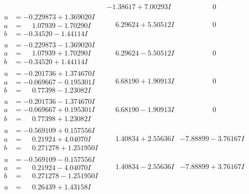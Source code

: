\documentclass[1p]{elsarticle_modified}
\theoremstyle{definition}
\begin{document}
$$\begin{array}{c|c|c}
 & -1.38617 + 7.00293 I & \phantom{-0.000000 } 0 \\ \hline\begin{aligned}
u &= -0.229873 + 1.369020 I \\
a &= \phantom{-}1.07939 - 1.70290 I \\
b &= -0.34520 - 1.44114 I\end{aligned}
 & \phantom{-}6.29624 + 5.50512 I & \phantom{-0.000000 } 0 \\ \hline\begin{aligned}
u &= -0.229873 - 1.369020 I \\
a &= \phantom{-}1.07939 + 1.70290 I \\
b &= -0.34520 + 1.44114 I\end{aligned}
 & \phantom{-}6.29624 - 5.50512 I & \phantom{-0.000000 } 0 \\ \hline\begin{aligned}
u &= -0.201736 + 1.374670 I \\
a &= -0.069667 - 0.195301 I \\
b &= \phantom{-}0.77398 - 1.23082 I\end{aligned}
 & \phantom{-}6.68190 + 1.90913 I & \phantom{-0.000000 } 0 \\ \hline\begin{aligned}
u &= -0.201736 - 1.374670 I \\
a &= -0.069667 + 0.195301 I \\
b &= \phantom{-}0.77398 + 1.23082 I\end{aligned}
 & \phantom{-}6.68190 - 1.90913 I & \phantom{-0.000000 } 0 \\ \hline\begin{aligned}
u &= -0.569109 + 0.157556 I \\
a &= \phantom{-}0.21924 + 4.04070 I \\
b &= \phantom{-}0.271278 + 1.251950 I\end{aligned}
 & \phantom{-}1.40834 + 2.55636 I & -7.88899 - 3.76167 I \\ \hline\begin{aligned}
u &= -0.569109 - 0.157556 I \\
a &= \phantom{-}0.21924 - 4.04070 I \\
b &= \phantom{-}0.271278 - 1.251950 I\end{aligned}
 & \phantom{-}1.40834 - 2.55636 I & -7.88899 + 3.76167 I \\ \hline\begin{aligned}
u &= \phantom{-}0.26439 + 1.43158 I \\

\end{aligned}
\end{array}$$
\end{document}
